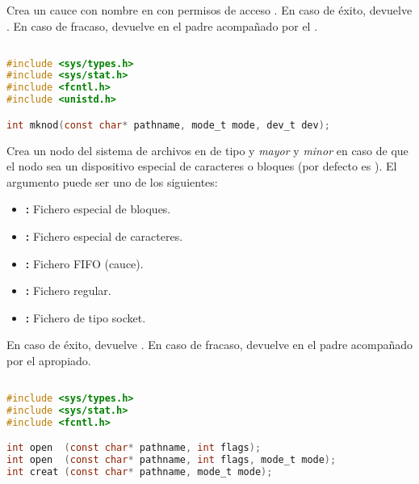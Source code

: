 Crea un cauce con nombre en  con permisos de acceso .
En caso de éxito, devuelve .
En caso de fracaso, devuelve  en el padre acompañado por el .

\subsection{}\label{mknod}

\begin{lstlisting}[language=C]
#include <sys/types.h>
#include <sys/stat.h>
#include <fcntl.h>
#include <unistd.h>

int mknod(const char* pathname, mode_t mode, dev_t dev);
\end{lstlisting}

Crea un nodo del sistema de archivos en  de tipo  y \emph{mayor} y \emph{minor}  en caso de que el nodo sea un dispositivo especial de caracteres o bloques (por defecto es ).
El argumento  puede ser uno de los siguientes:

\begin{itemize}
	\item{}\textbf{:} Fichero especial de bloques.
	\item{}\textbf{:} Fichero especial de caracteres.
	\item{}\textbf{:} Fichero FIFO (cauce).
	\item{}\textbf{:} Fichero regular.
	\item{}\textbf{:} Fichero de tipo socket.
\end{itemize}

En caso de éxito, devuelve .
En caso de fracaso, devuelve  en el padre acompañado por el  apropiado.

\subsection{}\label{open}

\begin{lstlisting}[language=C]
#include <sys/types.h>
#include <sys/stat.h>
#include <fcntl.h>

int open  (const char* pathname, int flags);
int open  (const char* pathname, int flags, mode_t mode);
int creat (const char* pathname, mode_t mode);
\end{lstlisting}

